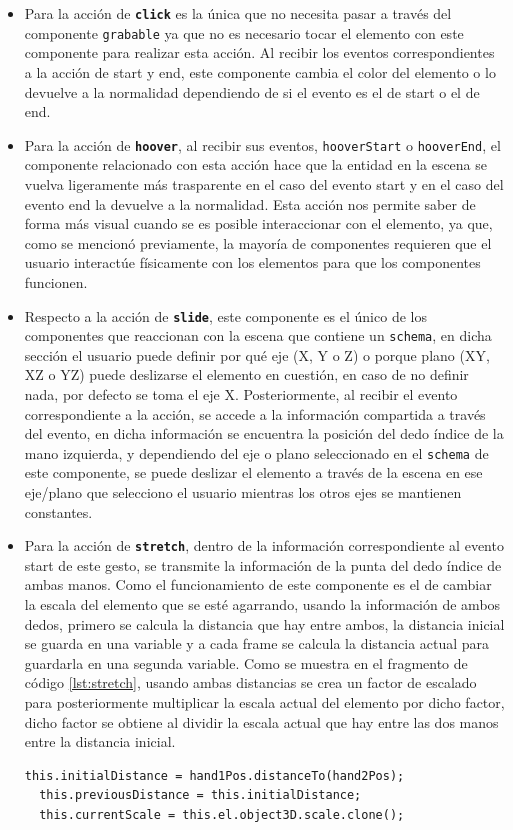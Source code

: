 \documentclass[a4paper, 12pt]{book}
\begin{document}
\begin{itemize}
  \item Para la acción de \textbf{\texttt{click}} es la única que no necesita pasar a través del componente \texttt{grabable} ya que no es necesario tocar el elemento con este componente para realizar esta acción. 
Al recibir los eventos correspondientes a la acción de start y end, este componente cambia el color del elemento o lo devuelve a la normalidad dependiendo de si el evento es el de start o el de end. 

  \item Para la acción de \textbf{\texttt{hoover}}, al recibir sus eventos, \texttt{hooverStart} o \texttt{hooverEnd}, el componente relacionado con esta acción hace que la entidad en la escena se vuelva ligeramente más trasparente en el caso del evento start y en el caso del evento end la devuelve a la normalidad. Esta acción nos permite saber de forma más visual cuando se es posible interaccionar con el elemento, ya que, como se mencionó previamente, la mayoría de componentes requieren que el usuario interactúe físicamente con los elementos para que los componentes funcionen.

  \item Respecto a la acción de \textbf{\texttt{slide}}, este componente es el único de los componentes que reaccionan con la escena que contiene un \texttt{schema}, en dicha sección el usuario puede definir por qué eje (X, Y o Z) o porque plano (XY, XZ o YZ) puede deslizarse el elemento en cuestión, en caso de no definir nada, por defecto se toma el eje X. Posteriormente, al recibir el evento correspondiente a la acción, se accede a la información compartida a través del evento, en dicha información se encuentra la posición del dedo índice de la mano izquierda, y dependiendo del eje o plano seleccionado en el \texttt{schema} de este componente, se puede deslizar el elemento a través de la escena en ese eje/plano que selecciono el usuario mientras los otros ejes se mantienen constantes.

  \item Para la acción de \textbf{\texttt{stretch}}, dentro de la información correspondiente al evento start de este gesto, se transmite la información de la punta del dedo índice de ambas manos. Como el funcionamiento de este componente es el de cambiar la escala del elemento que se esté agarrando, usando la información de ambos dedos, primero se calcula la distancia que hay entre ambos, la distancia inicial se guarda en una variable y a cada frame se calcula la distancia actual para guardarla en una segunda variable. Como se muestra en el fragmento de código \ref{lst:stretch}, usando ambas distancias se crea un factor de escalado para posteriormente multiplicar la escala actual del elemento por dicho factor, dicho factor se obtiene al dividir la escala actual que hay entre las dos manos entre la distancia inicial.
  \begin{lstlisting}[caption=Actualización del factor de escala, captionpos=b, label=lst:stretch]
  this.initialDistance = hand1Pos.distanceTo(hand2Pos);
  this.previousDistance = this.initialDistance;
  this.currentScale = this.el.object3D.scale.clone();


\end{lstlisting}
\end{itemize}
\end{document}
